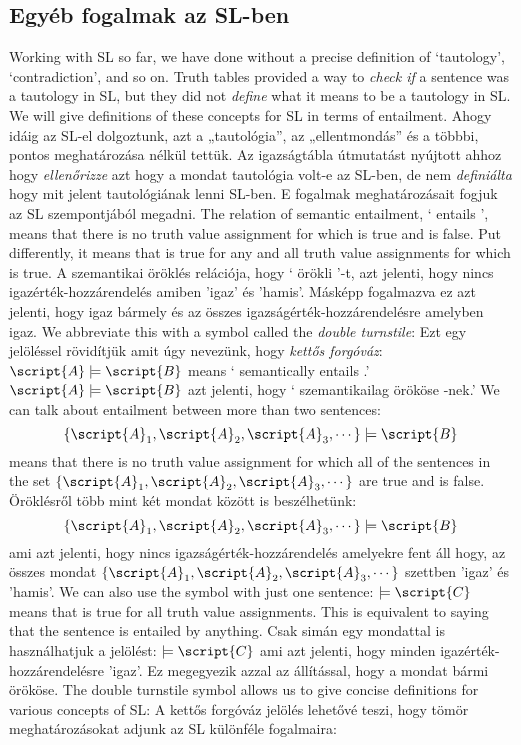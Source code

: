 \subsection{Egyéb fogalmak az SL-ben}
Working with SL so far, we have done without a precise definition of `tautology', `contradiction', and so on. Truth tables provided a way to \emph{check if} a sentence was a tautology in SL, but they did not \emph{define} what it means to be a tautology in SL. We will give definitions of these concepts for SL in terms of entailment.
Ahogy idáig az SL-el dolgoztunk, azt a „tautológia”, az „ellentmondás” és a többbi, pontos meghatározása nélkül tettük. Az igazságtábla útmutatást nyújtott ahhoz hogy \emph{ellenőrizze} azt hogy a mondat tautológia volt-e az SL-ben, de nem \emph{definiálta} hogy mit jelent tautológiának lenni SL-ben. E fogalmak meghatározásait fogjuk az SL szempontjából megadni.
The relation of semantic entailment, ` entails ', means that there is no truth value assignment for which  is true and  is false. Put differently, it means that  is true for any and all truth value assignments for which  is true.
A szemantikai öröklés relációja, hogy ` örökli '-t, azt jelenti, hogy nincs igazérték-hozzárendelés amiben  'igaz' és  'hamis'. Másképp fogalmazva ez azt jelenti, hogy  igaz bármely és az összes igazságérték-hozzárendelésre amelyben  igaz.
We abbreviate this with a symbol called the \emph{double turnstile}:
Ezt egy jelöléssel rövidítjük amit úgy nevezünk, hogy \emph{kettős forgóváz}:
$\script{A}\models\script{B}$ means ` semantically entails .'
$\script{A}\models\script{B}$ azt jelenti, hogy ` szemantikailag örököse -nek.'
We can talk about entailment between more than two sentences: $$\{\script{A}_1,\script{A}_2,\script{A}_3,\cdots\}\models\script{B}$$ means that there is no truth value assignment for which all of the sentences in the set $\{\script{A}_1,\script{A}_2,\script{A}_3,\cdots\}$ are true and  is false.
Öröklésről több mint két mondat között is beszélhetünk: $$\{\script{A}_1,\script{A}_2,\script{A}_3,\cdots\}\models\script{B}$$ ami azt jelenti, hogy nincs igazságérték-hozzárendelés amelyekre fent áll hogy, az összes mondat $\{\script{A}_1,\script{A}_2,\script{A}_3,\cdots\}$ szettben 'igaz' és  'hamis'.
We can also use the symbol with just one sentence: $\models\script{C}$ means that  is true for all truth value assignments. This is equivalent to saying that the sentence is entailed by anything.
Csak simán egy mondattal is használhatjuk a jelölést: $\models\script{C}$ ami azt jelenti, hogy  minden igazérték-hozzárendelésre 'igaz'. Ez megegyezik azzal az állítással, hogy a mondat bármi örököse.
The double turnstile symbol allows us to give concise definitions for various concepts of SL:
A kettős forgóváz jelölés lehetővé teszi, hogy tömör meghatározásokat adjunk az SL különféle fogalmaira:

